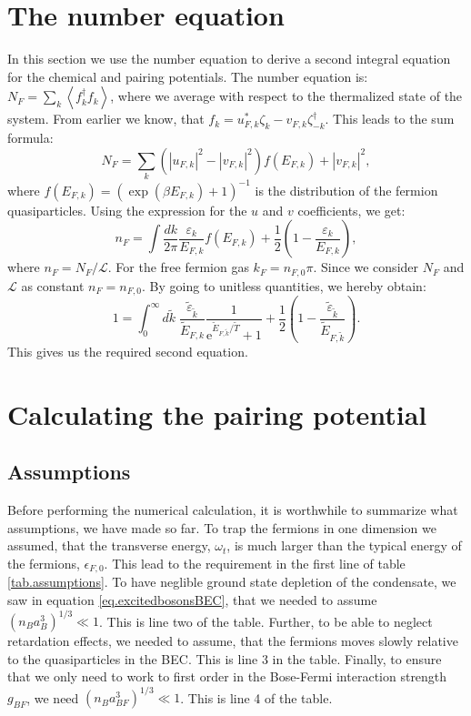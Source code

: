 \section{The number equation} \label{sec.chemicalpotential.numberequation}
In this section we use the number equation to derive a second integral equation for the chemical and pairing potentials. The number equation is: $N_F = \sum_k \left \langle f_k^\dagger f_k \right \rangle$, where we average with respect to the thermalized state of the system. From earlier we know, that $f_k = u_{F,k}^* \zeta_k -v_{F,k} \zeta_{-k}^\dagger$. This leads to the sum formula:
\begin{equation}
N_F = \sum_k \left(|u_{F,k}|^2-|v_{F,k}|^2\right) f(E_{F,k}) + |v_{F,k}|^2,\nonumber
\end{equation}
where $f(E_{F,k}) = (\exp(\beta E_{F,k}) + 1)^{-1}$ is the distribution of the fermion quasiparticles. Using the expression for the $u$ and $v$ coefficients, we get:
\begin{equation}
n_F = \int \frac{dk}{2\pi} \frac{\varepsilon_k}{E_{F,k}}f(E_{F,k}) + \frac{1}{2}\left(1 - \frac{\varepsilon_k}{E_{F,k}}\right), \nonumber
\end{equation}
where $n_F = N_F/\mathcal{L}$. For the free fermion gas $k_F = n_{F,0}\pi$. Since we consider $N_F$ and $\mathcal{L}$ as constant $n_F = n_{F,0}$. By going to unitless quantities, we hereby obtain:
\begin{equation}
1 = \int_0^\infty d\tilde{k} \; \frac{\tilde{\varepsilon}_{\tilde{k}}}{\tilde{E}_{F,k}}\frac{1}{\text{e}^{ \tilde{E}_{F,\tilde{k}}/\tilde{T} } + 1 } + \frac{1}{2}\left(1 - \frac{\tilde{\varepsilon}_{\tilde{k}}}{\tilde{E}_{F,\tilde{k}}}\right). 
\label{eq.NumberEquationUnitless}
\end{equation}
This gives us the required second equation.


\section{Calculating the pairing potential} \label{sec.pairingandchemicalpotential.numericalcalculation}
\subsection{Assumptions}
Before performing the numerical calculation, it is worthwhile to summarize what assumptions, we have made so far. To trap the fermions in one dimension we assumed, that the transverse energy, $\omega_t$, is much larger than the typical energy of the fermions, $\epsilon_{F,0}$. This lead to the requirement in the first line of table \ref{tab.assumptions}. To have neglible ground state depletion of the condensate, we saw in equation \eqref{eq.excitedbosonsBEC}, that we needed to assume $(n_Ba_B^3)^{1/3}\ll 1$. This is line two of the table. Further, to be able to neglect retardation effects, we needed to assume, that the fermions moves slowly relative to the quasiparticles in the BEC. This is line 3 in the table. Finally, to ensure that we only need to work to first order in the Bose-Fermi interaction strength $g_{BF}$, we need $(n_Ba_{BF}^3)^{1/3} \ll 1$. This is line 4 of the table. 

